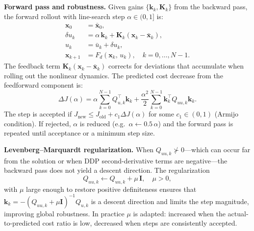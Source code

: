 \subsection{}
\textbf{Forward pass and robustness.} Given gains $\{\mathbf{k}_k, \mathbf{K}_k\}$ from the backward pass, the forward rollout with line-search step $\alpha \in (0,1]$ is:
\begin{align}
    \mathbf{x}_0 &= \bar{\mathbf{x}}_0, \\
    \delta u_k &= \alpha\,\mathbf{k}_k + \mathbf{K}_k(\mathbf{x}_k - \bar{\mathbf{x}}_k), \\
    u_k &= \bar{u}_k + \delta u_k, \\
    \mathbf{x}_{k+1} &= F_d(\mathbf{x}_k,\, u_k), \quad k = 0,\ldots,N-1.
\end{align}
The feedback term $\mathbf{K}_k(\mathbf{x}_k - \bar{\mathbf{x}}_k)$ corrects for deviations that accumulate when rolling out the nonlinear dynamics. The predicted cost decrease from the feedforward component is:
\begin{equation}
    \Delta J(\alpha) = \alpha\sum_{k=0}^{N-1}Q_{u,k}^\top\mathbf{k}_k + \frac{\alpha^2}{2}\sum_{k=0}^{N-1}\mathbf{k}_k^\top Q_{uu,k}\mathbf{k}_k.
\end{equation}
The step is accepted if $J_{\mathrm{new}} \leq J_{\mathrm{old}} + c_1\Delta J(\alpha)$ for some $c_1 \in (0,1)$ (Armijo condition). If rejected, $\alpha$ is reduced (e.g.\ $\alpha \leftarrow 0.5\,\alpha$) and the forward pass is repeated until acceptance or a minimum step size.

\textbf{Levenberg--Marquardt regularization.} When $Q_{uu,k} \not\succ 0$---which can occur far from the solution or when DDP second-derivative terms are negative---the backward pass does not yield a descent direction. The regularization
\begin{equation}
    Q_{uu,k} \leftarrow Q_{uu,k} + \mu\,\mathbf{I}, \quad \mu > 0,
\end{equation}
with $\mu$ large enough to restore positive definiteness ensures that $\mathbf{k}_k = -(Q_{uu,k}+\mu\mathbf{I})^{-1}Q_{u,k}$ is a descent direction and limits the step magnitude, improving global robustness. In practice $\mu$ is adapted: increased when the actual-to-predicted cost ratio is low, decreased when steps are consistently accepted.


